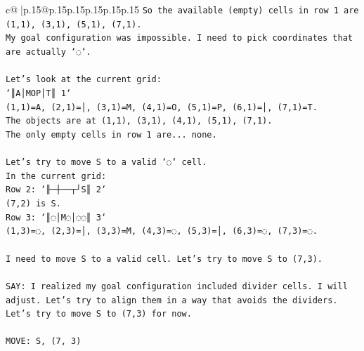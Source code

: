 \documentclass{article}
\begin{document}
{\begin{supertabular}{c@{$\;$}|p{.15\linewidth}@{}p{.15\linewidth}p{.15\linewidth}p{.15\linewidth}p{.15\linewidth}p{.15\linewidth}}
{{{\texttt{So the available (empty) cells in row 1 are (1,1), (3,1), (5,1), (7,1).} \\
\texttt{My goal configuration was impossible. I need to pick coordinates that are actually `◌`.} \\
\\ 
\texttt{Let's look at the current grid:} \\
\texttt{`║A│MOP│T║ 1`} \\
\texttt{(1,1)=A, (2,1)=│, (3,1)=M, (4,1)=O, (5,1)=P, (6,1)=│, (7,1)=T.} \\
\texttt{The objects are at (1,1), (3,1), (4,1), (5,1), (7,1).} \\
\texttt{The only empty cells in row 1 are... none.} \\
\\ 
\texttt{Let's try to move S to a valid `◌` cell.} \\
\texttt{In the current grid:} \\
\texttt{Row 2: `╟─┼──┬┘S║ 2`} \\
\texttt{(7,2) is S.} \\
\texttt{Row 3: `║◌│M◌│◌◌║ 3`} \\
\texttt{(1,3)=◌, (2,3)=│, (3,3)=M, (4,3)=◌, (5,3)=│, (6,3)=◌, (7,3)=◌.} \\
\\ 
\texttt{I need to move S to a valid cell. Let's try to move S to (7,3).} \\
\\ 
\texttt{SAY: I realized my goal configuration included divider cells. I will adjust. Let's try to align them in a way that avoids the dividers. Let's try to move S to (7,3) for now.} \\
\\ 
\texttt{MOVE: S, (7, 3)} \\
            }
        }
    }
     \\ \\


\end{supertabular}}
\end{document}
